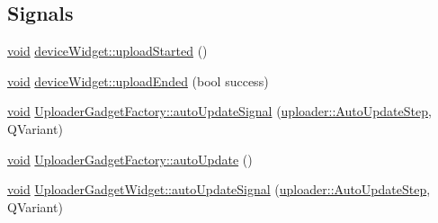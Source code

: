 \subsection*{Signals}
\begin{DoxyCompactItemize}
\item 
\hyperlink{group___u_a_v_objects_plugin_ga444cf2ff3f0ecbe028adce838d373f5c}{void} \hyperlink{group___y_modem_uploader_ga237b72fb1450126236fb690941ce7cf0}{device\-Widget\-::upload\-Started} ()
\item 
\hyperlink{group___u_a_v_objects_plugin_ga444cf2ff3f0ecbe028adce838d373f5c}{void} \hyperlink{group___y_modem_uploader_ga80c1daefa8adc8af10178e3ad8c52307}{device\-Widget\-::upload\-Ended} (bool success)
\item 
\hyperlink{group___u_a_v_objects_plugin_ga444cf2ff3f0ecbe028adce838d373f5c}{void} \hyperlink{group___y_modem_uploader_ga1db019129aec5db54cea977a3628092e}{Uploader\-Gadget\-Factory\-::auto\-Update\-Signal} (\hyperlink{namespaceuploader_adb90c08cc33a348c2363c1d7a9626422}{uploader\-::\-Auto\-Update\-Step}, Q\-Variant)
\item 
\hyperlink{group___u_a_v_objects_plugin_ga444cf2ff3f0ecbe028adce838d373f5c}{void} \hyperlink{group___y_modem_uploader_gaf1635d4877cd9ffd1933c45884278845}{Uploader\-Gadget\-Factory\-::auto\-Update} ()
\item 
\hyperlink{group___u_a_v_objects_plugin_ga444cf2ff3f0ecbe028adce838d373f5c}{void} \hyperlink{group___y_modem_uploader_ga87ead7222452d2bbbbde0f0450ed8c11}{Uploader\-Gadget\-Widget\-::auto\-Update\-Signal} (\hyperlink{namespaceuploader_adb90c08cc33a348c2363c1d7a9626422}{uploader\-::\-Auto\-Update\-Step}, Q\-Variant)
\end{DoxyCompactItemize}
